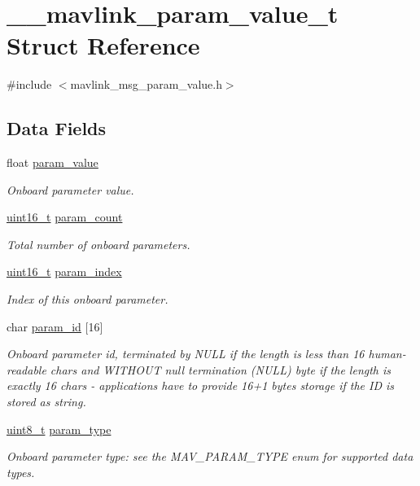\hypertarget{struct____mavlink__param__value__t}{\section{\-\_\-\-\_\-mavlink\-\_\-param\-\_\-value\-\_\-t Struct Reference}
\label{struct____mavlink__param__value__t}
}


{\ttfamily \#include $<$mavlink\-\_\-msg\-\_\-param\-\_\-value.\-h$>$}

\subsection*{Data Fields}
\begin{DoxyCompactItemize}
\item 
float \hyperlink{struct____mavlink__param__value__t_acd7d6401383f92dac17a95946b501a50}{param\-\_\-value}
\begin{DoxyCompactList}\small\item\em Onboard parameter value. \end{DoxyCompactList}\item 
\hyperlink{stdint_8h_a273cf69d639a59973b6019625df33e30}{uint16\-\_\-t} \hyperlink{struct____mavlink__param__value__t_ab53bec8370ac590fc761b9a9de49f6b6}{param\-\_\-count}
\begin{DoxyCompactList}\small\item\em Total number of onboard parameters. \end{DoxyCompactList}\item 
\hyperlink{stdint_8h_a273cf69d639a59973b6019625df33e30}{uint16\-\_\-t} \hyperlink{struct____mavlink__param__value__t_a213d71adbd95b241f962dd1d375c3a5a}{param\-\_\-index}
\begin{DoxyCompactList}\small\item\em Index of this onboard parameter. \end{DoxyCompactList}\item 
char \hyperlink{struct____mavlink__param__value__t_af686385ecc22c23ab4e2b5d115838119}{param\-\_\-id} \mbox{[}16\mbox{]}
\begin{DoxyCompactList}\small\item\em Onboard parameter id, terminated by N\-U\-L\-L if the length is less than 16 human-\/readable chars and W\-I\-T\-H\-O\-U\-T null termination (N\-U\-L\-L) byte if the length is exactly 16 chars -\/ applications have to provide 16+1 bytes storage if the I\-D is stored as string. \end{DoxyCompactList}\item 
\hyperlink{stdint_8h_aba7bc1797add20fe3efdf37ced1182c5}{uint8\-\_\-t} \hyperlink{struct____mavlink__param__value__t_a825cfefbe7cfd71991186c4ffc897447}{param\-\_\-type}
\begin{DoxyCompactList}\small\item\em Onboard parameter type\-: see the M\-A\-V\-\_\-\-P\-A\-R\-A\-M\-\_\-\-T\-Y\-P\-E enum for supported data types. \end{DoxyCompactList}\end{DoxyCompactItemize}



